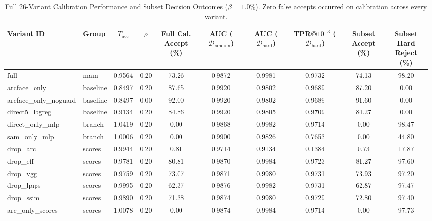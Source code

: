 \documentclass[journal]{IEEEtran}
\begin{document}
\begin{table}[t]
\centering
\caption{Full 26-Variant Calibration Performance and Subset Decision Outcomes ($\beta = 1.0\%$). Zero false accepts occurred on calibration across every variant.}
\label{tab:s1_all}
\scriptsize
\setlength{\tabcolsep}{3.5pt}
\begin{tabular}{@{}llcccccccc@{}}
\toprule
\textbf{Variant ID} & \textbf{Group} & \textbf{$T_{\text{acc}}$} & \textbf{$\rho$} & \makecell{\textbf{Full Cal.}\\\textbf{Accept (\%)}} & \makecell{\textbf{AUC}\\\textbf{($\mathcal{D}_{\text{random}}$)}} & \makecell{\textbf{AUC}\\\textbf{($\mathcal{D}_{\text{hard}}$)}} & \makecell{\textbf{TPR@$10^{-3}$}\\\textbf{($\mathcal{D}_{\text{hard}}$)}} & \makecell{\textbf{Subset}\\\textbf{Accept (\%)}} & \makecell{\textbf{Subset Hard}\\\textbf{Reject (\%)}} \\
\midrule
full & main & 0.9564 & 0.20 & 73.26 & 0.9872 & 0.9981 & 0.9732 & 74.13 & 98.20 \\
arcface\_only & baseline & 0.8497 & 0.20 & 87.65 & 0.9920 & 0.9802 & 0.9689 & 87.20 & 0.00 \\
arcface\_only\_noguard & baseline & 0.8497 & 0.00 & 92.00 & 0.9920 & 0.9802 & 0.9689 & 91.60 & 0.00 \\
direct5\_logreg & baseline & 0.9134 & 0.20 & 84.86 & 0.9920 & 0.9805 & 0.9709 & 84.27 & 0.00 \\
direct\_only\_mlp & branch & 1.0419 & 0.20 & 0.00 & 0.9868 & 0.9982 & 0.9714 & 0.00 & 98.47 \\
sam\_only\_mlp & branch & 1.0006 & 0.20 & 0.00 & 0.9900 & 0.9826 & 0.7653 & 0.00 & 44.80 \\
drop\_arc & scores & 0.9944 & 0.20 & 0.81 & 0.9714 & 0.9134 & 0.1384 & 0.73 & 17.87 \\
drop\_eff & scores & 0.9781 & 0.20 & 80.81 & 0.9870 & 0.9984 & 0.9723 & 81.27 & 97.60 \\
drop\_vgg & scores & 0.9759 & 0.20 & 73.07 & 0.9871 & 0.9980 & 0.9731 & 73.93 & 97.20 \\
drop\_lpips & scores & 0.9995 & 0.20 & 62.37 & 0.9876 & 0.9982 & 0.9731 & 62.87 & 97.47 \\
drop\_ssim & scores & 0.9890 & 0.20 & 71.38 & 0.9874 & 0.9980 & 0.9729 & 72.80 & 97.40 \\
arc\_only\_scores & scores & 1.0078 & 0.20 & 0.00 & 0.9874 & 0.9984 & 0.9714 & 0.00 & 97.73 \\

\end{tabular}
\end{table}
\end{document}
